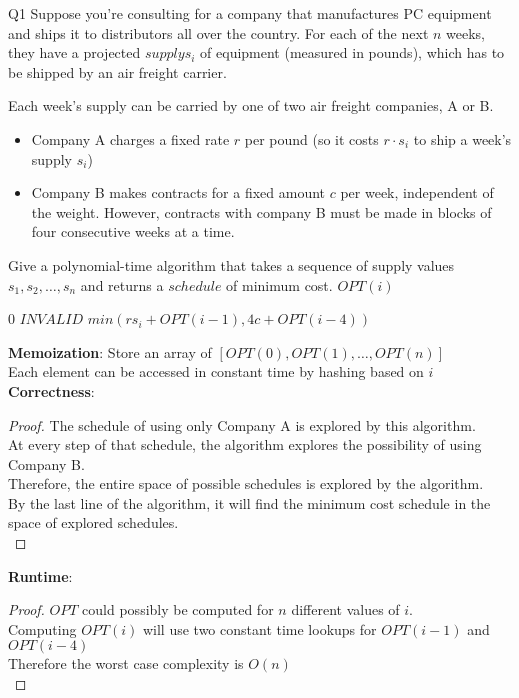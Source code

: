 \begin{problem}
  {Q1}
  Suppose you're consulting for a company that manufactures PC equipment and ships it to distributors all over the country.
  For each of the next $n$ weeks, they have a projected $supply s_i$ of equipment (measured in pounds), which has to be shipped
  by an air freight carrier.

  Each week's supply can be carried by one of two air freight companies, A or B.
  \begin{itemize}
    \item Company A charges a fixed rate $r$ per pound (so it costs $r \cdot s_i$ to ship a week's supply $s_i$)
    \item Company B makes contracts for a fixed amount $c$ per week, independent of the weight.
          However, contracts with company B must be made in blocks of four consecutive weeks at a time.
  \end{itemize}
  Give a polynomial-time algorithm that takes a sequence of supply values $s_1, s_2, \dots, s_n$ and returns a $schedule$ of minimum cost.
  $OPT(i)$
  \begin{algorithmic}[1]
      \RETURN $0$
      \ENDIF
      \RETURN $INVALID$
      \ENDIF
      \RETURN $min(rs_i + OPT(i-1), 4c + OPT(i-4))$
  \end{algorithmic}
  \noindent
  \textbf{Memoization}:
  Store an array of $[OPT(0), OPT(1), \dots, OPT(n)]$ \\
  Each element can be accessed in constant time by hashing based on $i$
  \noindent
  \textbf{Correctness}:
  \begin{proof}
    The schedule of using only Company A is explored by this algorithm. \\
    At every step of that schedule, the algorithm explores the possibility of using Company B. \\
    Therefore, the entire space of possible schedules is explored by the algorithm. \\
    By the last line of the algorithm, it will find the minimum cost schedule in the space of explored schedules. \\
  \end{proof}
  \noindent
  \textbf{Runtime}:
  \begin{proof}
      $OPT$ could possibly be computed for $n$ different values of $i$. \\
      Computing $OPT(i)$ will use two constant time lookups for $OPT(i-1)$ and $OPT(i-4)$ \\
      Therefore the worst case complexity is $O(n)$ \\
  \end{proof}
\end{problem}
